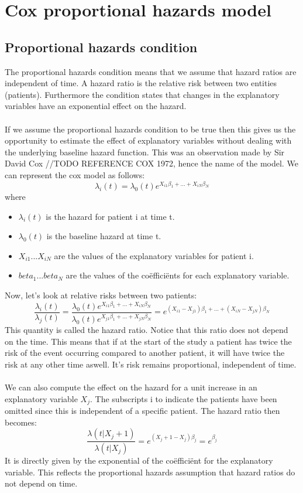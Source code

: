 \section{Cox proportional hazards model}
\label{sec:cox-proportional-hazards-model}
\subsection{Proportional hazards condition}
The proportional hazards condition means that we assume that hazard ratios are independent of time. A hazard ratio is the relative risk between two entities (patients). Furthermore the condition states that changes in the explanatory variables have an exponential effect on the hazard. \\ \\
If we assume the proportional hazards condition to be true then this gives us the opportunity to estimate the effect of explanatory variables without dealing with the underlying baseline hazard function. This was an observation made by Sir David Cox //TODO REFERENCE COX 1972, hence the name of the model. We can represent the cox model as follows:
$$
\lambda_{i}(t) = \lambda_{0}(t)e^{X_{i1}\beta_{1} + ... + X_{iN}\beta_{N}}
$$
where
\begin{itemize}
	\item $\lambda_{i}(t)$ is the hazard for patient i at time t.
	\item $\lambda_{0}(t)$ is the baseline hazard at time t.
	\item $X_{i1} ... X_{iN}$ are the values of the explanatory variables for patient i.
	\item $beta_{1} ... beta_{N}$ are the values of the co\"effici\"ents for each explanatory variable.
\end{itemize}
Now, let's look at relative risks between two patients:
$$
\frac{\lambda_{i}(t)}{\lambda_{j}(t)} 
= \frac{\lambda_{0}(t)e^{X_{i1}\beta_{1} + ... + X_{iN}\beta_{N}}}{\lambda_{0}(t)e^{X_{j1}\beta_{1} + ... + X_{jN}\beta_{N}}}
= e^{(X_{i1}-X_{j1})\beta_{1} + ... + (X_{iN}-X_{jN})\beta_{N}}
$$
This quantity is called the hazard ratio. Notice that this ratio does not depend on the time. This means that if at the start of the study a patient has twice the risk of the event occurring compared to another patient, it will have twice the risk at any other time aswell. It's risk remains proportional, independent of time. \\ \\
We can also compute the effect on the hazard for a unit increase in an explanatory variable $X_{j}$. The subscripts i to indicate the patients have been omitted since this is independent of a specific patient. The hazard ratio then becomes:
$$
\frac{\lambda(t|X_{j}+1)}{\lambda(t|X_{j})} = e^{(X_{j}+1-X_{j})\beta_{j}} = e^{\beta_{j}}
$$
It is directly given by the exponential of the co\"effici\"ent for the explanatory variable. This reflects the proportional hazards assumption that hazard ratios do not depend on time.
